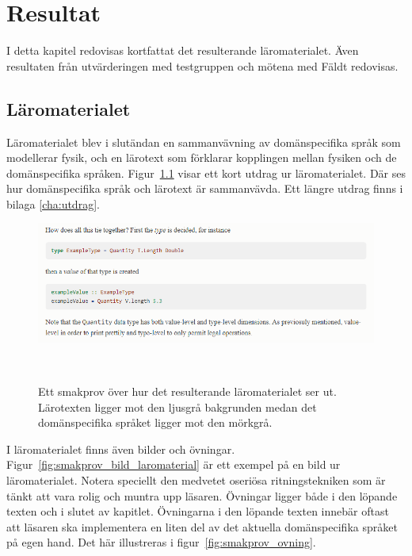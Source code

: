 
\chapter{Resultat}

I detta kapitel redovisas kortfattat det resulterande läromaterialet. Även
resultaten från utvärderingen med testgruppen och mötena med Fäldt redovisas.

\begin{draft}

\section{Läromaterialet}
\label{sec:res_laromaterial}

Läromaterialet blev i slutändan en sammanvävning av domänspecifika språk som
modellerar fysik, och en lärotext som förklarar kopplingen mellan fysiken och de
domänspecifika språken. Figur~\ref{fig:smakprov_laromaterial} visar ett kort
utdrag ur läromaterialet. Där ses hur domänspecifika språk och lärotext
är sammanvävda. Ett längre utdrag finns i bilaga \ref{cha:utdrag}.

\begin{figure}[tph]
  \includegraphics[width=\linewidth]{figure/smakprov_laromaterial.png}
  \caption{Ett smakprov över hur det resulterande läromaterialet ser ut.
           Lärotexten ligger mot den ljusgrå bakgrunden medan det
           domänspecifika språket ligger mot den
           mörkgrå.}~\label{fig:smakprov_laromaterial} 
\end{figure}

I läromaterialet finns även bilder och övningar.
Figur~\ref{fig:smakprov_bild_laromaterial} är ett exempel på en bild ur
läromaterialet. Notera speciellt den medvetet oseriösa ritningstekniken som är
tänkt att vara rolig och muntra upp läsaren. Övningar ligger både i den löpande
texten och i slutet av kapitlet. Övningarna i den löpande texten innebär oftast
att läsaren ska implementera en liten del av det aktuella domänspecifika språket
på egen hand. Det här illustreras i figur~\ref{fig:smakprov_ovning}.


\end{draft}
